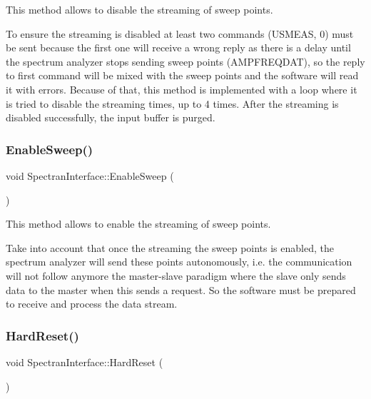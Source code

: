 This method allows to disable the streaming of sweep points. 

To ensure the streaming is disabled at least two commands (U\+S\+M\+E\+AS, 0) must be sent because the first one will receive a wrong reply as there is a delay until the spectrum analyzer stops sending sweep points (A\+M\+P\+F\+R\+E\+Q\+D\+AT), so the reply to first command will be mixed with the sweep points and the software will read it with errors. Because of that, this method is implemented with a loop where it is tried to disable the streaming times, up to 4 times. After the streaming is disabled successfully, the input buffer is purged. \mbox{\label{classSpectranInterface_ac812a1bcaede6504f62cc544c30fffea}} 
\subsubsection{\texorpdfstring{Enable\+Sweep()}{EnableSweep()}}
{\footnotesize\ttfamily void Spectran\+Interface\+::\+Enable\+Sweep (\begin{DoxyParamCaption}{ }\end{DoxyParamCaption})}



This method allows to enable the streaming of sweep points. 

Take into account that once the streaming the sweep points is enabled, the spectrum analyzer will send these points autonomously, i.\+e. the communication will not follow anymore the master-\/slave paradigm where the slave only sends data to the master when this sends a request. So the software must be prepared to receive and process the data stream. \mbox{\label{classSpectranInterface_a44ee786fb582c5db42253ec0c96f3b8e}} 
\subsubsection{\texorpdfstring{Hard\+Reset()}{HardReset()}}
{\footnotesize\ttfamily void Spectran\+Interface\+::\+Hard\+Reset (\begin{DoxyParamCaption}{ }\end{DoxyParamCaption})}



